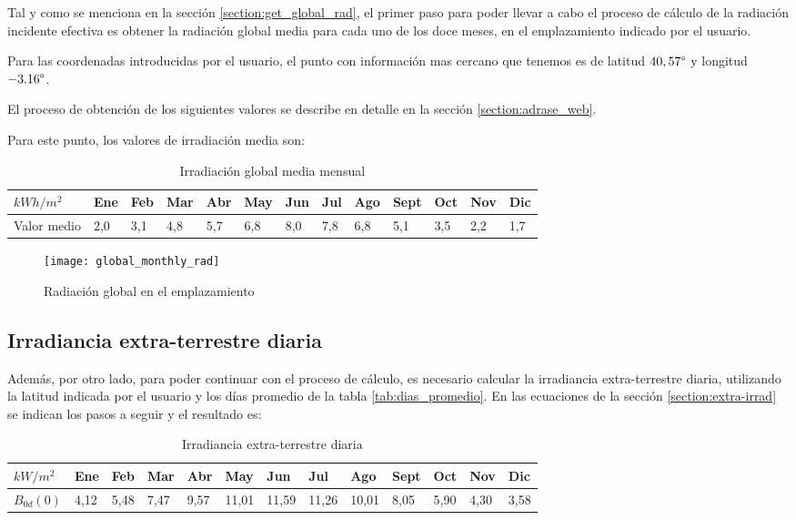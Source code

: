 Tal y como se menciona en la sección \ref{section:get_global_rad}, el primer paso para poder llevar a cabo el proceso de cálculo de la radiación incidente efectiva es obtener la radiación global media para cada uno de los doce meses, en el emplazamiento indicado por el usuario.

Para las coordenadas introducidas por el usuario, el punto con información mas cercano que tenemos es de latitud  $40,57 \degree$ y longitud $-3.16 \degree$. 

El proceso de obtención de los siguientes valores se describe en detalle en la sección \ref{section:adrase_web}.

Para este punto, los valores de irradiación media son:
\begin{table}[ht]
\centering
\begin{tabular}{|l|l|l|l|l|l|l|l|l|l|l|l|l|}
\hline
$kWh/m^2$   & Ene & Feb & Mar & Abr & May & Jun & Jul & Ago & Sept & Oct & Nov & Dic \\ \hline
Valor medio & 2,0 & 3,1 & 4,8 & 5,7 & 6,8 & 8,0 & 7,8 & 6,8 & 5,1  & 3,5 & 2,2 & 1,7 \\ \hline
\end{tabular}
\label{tab:mean_values_monthly}
\caption{Irradiación global media mensual}
\end{table}

\begin{figure}[ht]
\texttt{[image: global\_monthly\_rad]}
\centering
\caption{Radiación global en el emplazamiento}
\label{fig:mean_values_monthly}
\end{figure}

\subsection{Irradiancia extra-terrestre diaria}

Además, por otro lado, para poder continuar con el proceso de cálculo, es necesario calcular la irradiancia extra-terrestre diaria, utilizando la latitud indicada por el usuario y los días promedio de la tabla \ref{tab:dias_promedio}.
En las ecuaciones de la sección \ref{section:extra-irrad} se indican los pasos a seguir y el resultado es:
\begin{table}[ht]
\centering
\begin{tabular}{|l|l|l|l|l|l|l|l|l|l|l|l|l|}
\hline
$kW/m^2$   & Ene & Feb & Mar & Abr & May & Jun & Jul & Ago & Sept & Oct & Nov & Dic \\ \hline
$B_{0d}(0)$ & 4,12 & 5,48 & 7,47 & 9,57 & 11,01 & 11,59 & 11,26 & 10,01 & 8,05 & 5,90  & 4,30 & 3,58 \\ \hline
\end{tabular}
\label{tab:extra_irrad_values}
\caption{Irradiancia extra-terrestre diaria}
\end{table}

